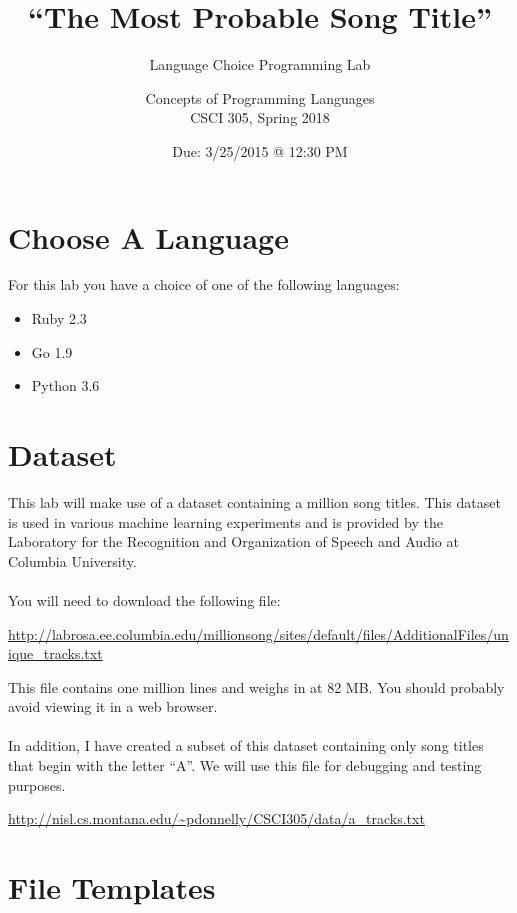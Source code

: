 \documentclass{article}
\title{``The Most Probable Song Title''}
\subtitle{Language Choice Programming Lab}
\author{Concepts of Programming Languages\\CSCI 305, Spring 2018}
\date{Due: 3/25/2015 @ 12:30 PM}
\begin{document}
\maketitle

\section*{Choose A Language}
For this lab you have a choice of one of the following languages:
\begin{itemize}
 \item Ruby 2.3
 \item Go 1.9
 \item Python 3.6
\end{itemize}

\section*{Dataset}
This lab will make use of a dataset containing a million song titles. This dataset is used in various machine learning experiments and is provided by the Laboratory for the Recognition and Organization of Speech and Audio at Columbia University.
\\\\
\noindent You will need to download the following file:
\begin{center}
 \url{http://labrosa.ee.columbia.edu/millionsong/sites/default/files/AdditionalFiles/unique_tracks.txt}
\end{center}
This file contains one million lines and weighs in at 82 MB. You should probably avoid viewing it in a web browser.
\\\\
\noindent In addition, I have created a subset of this dataset containing only song titles that begin with the letter ``A''. We will use this file for debugging and testing purposes.
\begin{center}
 \url{http://nisl.cs.montana.edu/~pdonnelly/CSCI305/data/a_tracks.txt}
\end{center}


\section*{File Templates}
\end{document}
